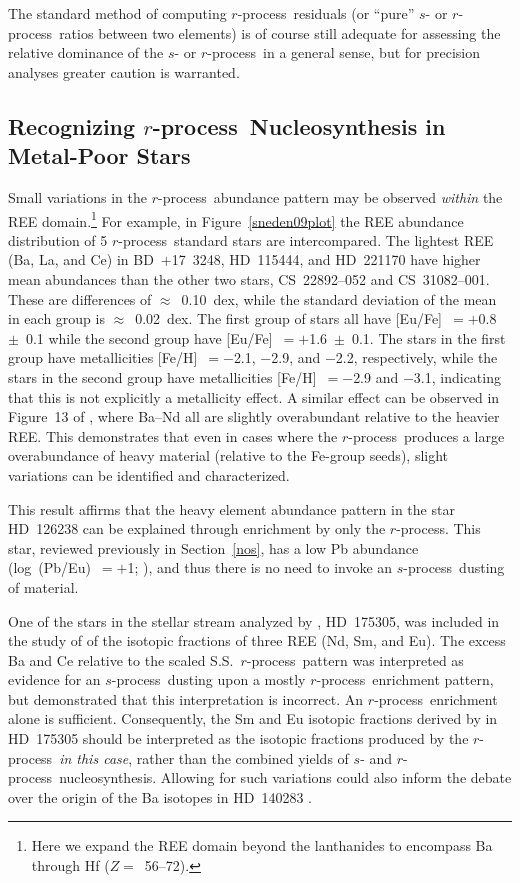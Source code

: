 \documentclass{emulateapj}
\def\rpro{\mbox{$r$-process}}
\def\spro{\mbox{$s$-process}}
\begin{document}
The standard method of computing \rpro\
residuals (or ``pure'' $s$- or \rpro\ ratios between two elements)
is of course
still adequate for assessing the relative dominance of the
$s$- or \rpro\ in a general sense, but 
for precision analyses greater caution is warranted.


\subsection{Recognizing \rpro\ Nucleosynthesis in Metal-Poor Stars}
\label{examples}


Small variations in the \rpro\ abundance pattern may be observed
\textit{within} the REE domain.\footnote{Here we expand the REE domain
beyond the lanthanides to encompass Ba through Hf ($Z =$~56--72).} 
For example, in Figure~\ref{sneden09plot} the
REE abundance distribution of 5 \rpro\ 
standard stars are intercompared.  
The lightest REE
(Ba, La, and Ce) in 
\mbox{BD~$+$17~3248}, \mbox{HD~115444}, and \mbox{HD~221170}
have higher mean abundances than
the other two stars, \mbox{CS~22892--052} and \mbox{CS~31082--001}.
These are differences of $\approx$~0.10~dex, while the 
standard deviation of the mean in each group is $\approx$~0.02~dex.
The first group of stars all have [Eu/Fe]~$= +$0.8~$\pm$~0.1
while the second group have [Eu/Fe]~$= +$1.6~$\pm$~0.1.
The stars in the first group  have metallicities 
[Fe/H]~$= -$2.1, $-$2.9, and $-$2.2, respectively, while the
stars in the second group have metallicities
[Fe/H]~$= -$2.9 and $-$3.1, indicating that this is not
explicitly a metallicity effect.
A similar effect can be observed in Figure~13 of \citet{roederer10a},
where Ba--Nd all are slightly overabundant relative to the heavier
REE.
This demonstrates that even in cases where the \rpro\ produces
a large overabundance of heavy material (relative to the 
Fe-group seeds), slight variations can be identified and characterized.

This result affirms that the heavy element abundance pattern in the star 
\mbox{HD~126238} 
can be explained through enrichment by only the \rpro.
This star, reviewed previously in Section~\ref{nos}, 
has a low Pb abundance (log~(Pb/Eu)~$= +$1; \citealt{cowan96}), 
and thus there is no need to invoke an \spro\ dusting of material.

One of the stars in the stellar stream
analyzed by \citet{roederer10a}, \mbox{HD~175305},
was included in the study of \citet{roederer08a} of
the isotopic fractions of three REE (Nd, Sm, and Eu).
The excess Ba and Ce relative to the scaled S.S.\ \rpro\ pattern
was interpreted as evidence for an \spro\ dusting upon
a mostly \rpro\ enrichment pattern, but \citet{roederer10a} 
demonstrated that this interpretation is incorrect.
An \rpro\ enrichment alone is sufficient.
Consequently, the Sm and Eu isotopic fractions derived by \citet{roederer08a}
in \mbox{HD~175305}
should be interpreted as the isotopic fractions produced
by the \rpro\ \textit{in this case}, rather than the combined
yields of $s$- and \rpro\ nucleosynthesis.
Allowing for such variations could also inform the debate over the origin of 
the Ba isotopes in \mbox{HD~140283} 
\citep{magain95,lambert02,collet09,gallagher10}.
\end{document}
